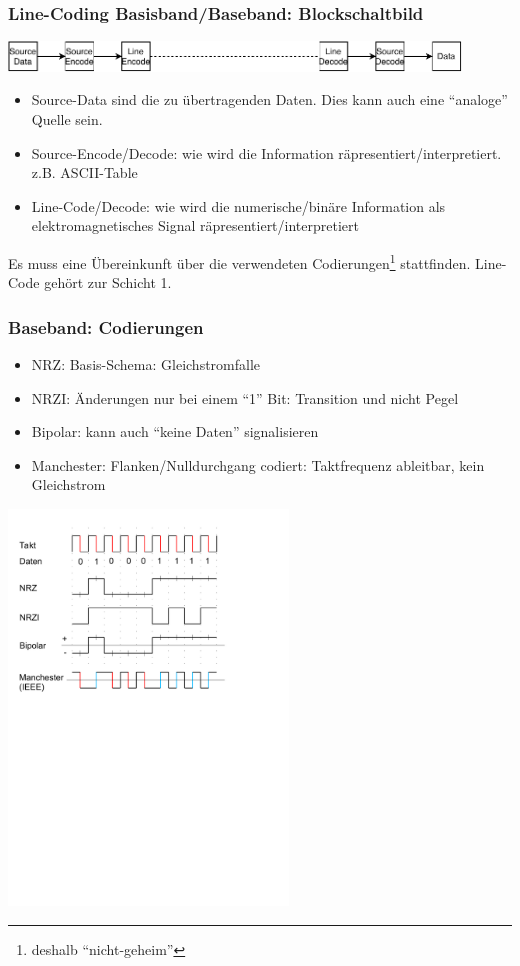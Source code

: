 \documentclass[ignorenonframetext]{beamer}
\begin{document}
\begin{frame}
\frametitle{Line-Coding Basisband/Baseband: Blockschaltbild}
\includegraphics[width=12cm]{baseband-circuit}
\begin{itemize}
  \item Source-Data sind die zu \"ubertragenden Daten. Dies kann auch eine ``analoge'' Quelle sein.
  \item Source-Encode/Decode: wie wird die Information r\"apresentiert/interpretiert. z.B. ASCII-Table
  \item Line-Code/Decode: wie wird die numerische/bin\"are Information als elektromagnetisches Signal r\"apresentiert/interpretiert
\end{itemize}
\begin{block}{}
Es muss eine \"Ubereinkunft \"uber die verwendeten Codierungen\footnote{deshalb ``nicht-geheim''} stattfinden. Line-Code geh\"ort zur Schicht 1.
\end{block}
\end{frame}


\begin{frame}
\frametitle{Baseband: Codierungen}
\begin{small}
\begin{itemize}
  \item NRZ: Basis-Schema: Gleichstromfalle
  \item NRZI: \"Anderungen nur bei einem ``1'' Bit: Transition und nicht Pegel
  \item Bipolar: kann auch ``keine Daten'' signalisieren
  \item Manchester: Flanken/Nulldurchgang codiert: Taktfrequenz ableitbar, kein Gleichstrom
\end{itemize}
\end{small}
\includegraphics[height=10.5cm]{bitcodes}

\end{frame}
\end{document}
